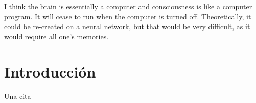 \begin{savequote}[72mm]

I think the brain is essentially a computer and consciousness is like
a computer program. It will cease to run when the computer is turned
off. Theoretically, it could be re-created on a neural network, but
that would be very difficult, as it would require all one's memories.

\end{savequote}

\chapter{Introducción}
\label{cha:Introducción}

\graphicspath{{1_introduction/images/}}

Una cita~\cite{rosenblatt1958perceptron}

